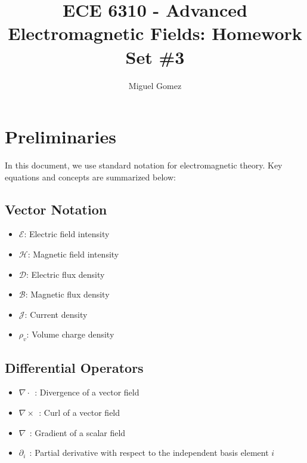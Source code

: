 \documentclass[12pt]{article}
\newcommand{\TimeUntilDue}{
  \ifnum\daystilldue<4
    \textcolor{red}{
    \number\daystilldue\ days - 
    \number\hourstilldue\ hours - 
    \number\minutestilldue\ min until deadline!!
  }
\else
    \number\daystilldue\ days - 
    \number\hourstilldue\ hours - 
    \number\minutestilldue\ min until deadline
  \fi
}
\begin{document}
\newcommand{\Cross}[2]{
\hat a_x(#1_2#2_3 -#1_3#2_2) -\hat a_y(#1_1#2_3-#1_3#2_1) + \hat a_z(#1_1#2_2-#1_2#2_1) 
}
\title{ECE 6310 - Advanced Electromagnetic Fields: Homework Set \#3}
\author{Miguel Gomez}
\maketitle

\section*{Preliminaries}
In this document, we use standard notation for electromagnetic theory. Key equations and concepts are summarized below:

\subsection*{Vector Notation}
\begin{itemize}
  \item $\bm{\mathcal{E}}$: Electric field intensity
  \item $\bm{\mathcal{H}}$: Magnetic field intensity
  \item $\bm{\mathcal{D}}$: Electric flux density
  \item $\bm{\mathcal{B}}$: Magnetic flux density
  \item $\bm{\mathcal{J}}$: Current density
  \item $\rho_v$: Volume charge density
\end{itemize}

\subsection*{Differential Operators}
\begin{itemize}
  \item $\nabla \cdot\ \ $: Divergence of a vector field
  \item $\nabla \times\ \ $: Curl of a vector field
  \item $\nabla\ \ $: Gradient of a scalar field
  \item $\partial_i\ \ $: Partial derivative with respect to the independent basis element $i$
\end{itemize}
\end{document}
